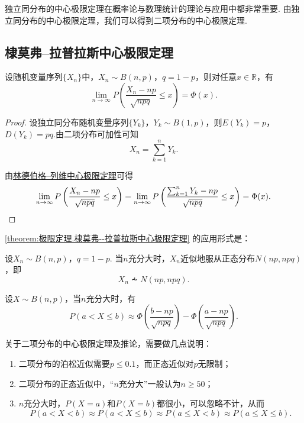 独立同分布的中心极限定理在概率论与数理统计的理论与应用中都非常重要.
由独立同分布的中心极限定理，我们可以得到二项分布的中心极限定理.
\subsection{棣莫弗--拉普拉斯中心极限定理}
\begin{theorem}\label{theorem:极限定理.棣莫弗--拉普拉斯中心极限定理}
设随机变量序列\(\{X_n\}\)中，\(X_n \sim B(n,p)\)，\(q = 1-p\)，则对任意\(x \in \mathbb{R}\)，有\[
\lim_{n\to\infty} P\left( \frac{X_n - np}{\sqrt{npq}} \leq x \right) = \Phi(x).
\]
\begin{proof}
设独立同分布随机变量序列\(\{Y_k\}\)，\(Y_k \sim B(1,p)\)，则\(E(Y_k)=p\)，\(D(Y_k)=pq\).由二项分布可加性可知\[
X_n = \sum_{k=1}^n{Y_k}.
\]

由\hyperref[theorem:极限定理.林德伯格--列维中心极限定理]{林德伯格--列维中心极限定理}可得\[
\lim_{n\to\infty} P\left(\frac{X_n-np}{\sqrt{npq}} \leq x\right)
= \lim_{n\to\infty} P\left(\frac{\sum_{k=1}^n{Y_k}-np}{\sqrt{npq}} \leq x\right)
= \Phi(x).
\qedhere
\]
\end{proof}
\end{theorem}

\cref{theorem:极限定理.棣莫弗--拉普拉斯中心极限定理} 的应用形式是：
\begin{corollary}
设\(X_n \sim B(n,p)\)，\(q = 1-p\).
当\(n\)充分大时，\(X_n\)近似地服从正态分布\(N(np,npq)\)，即\[
X_n \dotsim N(np,npq).
\]
\end{corollary}

\begin{corollary}
设\(X \sim B(n,p)\)，当\(n\)充分大时，有\[
P(a < X \leq b)
\approx \Phi\left(\frac{b-np}{\sqrt{npq}}\right) - \Phi\left(\frac{a-np}{\sqrt{npq}}\right).
\]
\end{corollary}

关于二项分布的中心极限定理及推论，需要做几点说明：
\begin{enumerate}
\item 二项分布的泊松近似需要\(p \leq 0.1\)，而正态近似对\(p\)无限制；
\item 二项分布的正态近似中，“\(n\)充分大”一般认为\(n \geq 50\)；
\item \(n\)充分大时，\(P(X=a)\)和\(P(X=b)\)都很小，可以忽略不计，从而\[
P(a < X < b)
\approx P(a < X \leq b)
\approx P(a \leq X < b)
\approx P(a \leq X \leq b).
\]
\end{enumerate}
